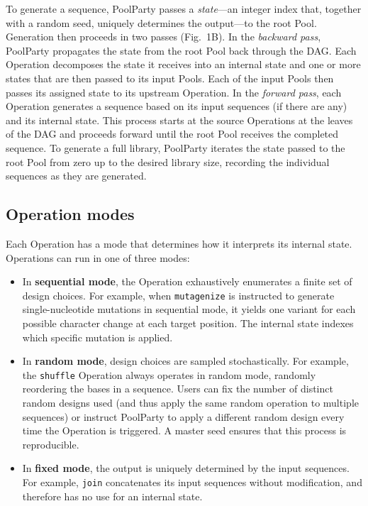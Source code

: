 \documentclass[unnumsec,webpdf,modern,large]{mam-authoring-template}%
\theoremstyle{thmstyleone}%
\theoremstyle{thmstyletwo}%
\theoremstyle{thmstylethree}%
\begin{document}
To generate a sequence, PoolParty passes a \emph{state}---an integer index that, together with a random seed, uniquely determines the output---to the root Pool. Generation then proceeds in two passes (Fig.~1B). In the \emph{backward pass}, PoolParty propagates the state from the root Pool back through the DAG. Each Operation decomposes the state it receives into an internal state and one or more states that are then passed to its input Pools. Each of the input Pools then passes its assigned state to its upstream Operation. In the \emph{forward pass}, each Operation generates a sequence based on its input sequences (if there are any) and its internal state. This process starts at the source Operations at the leaves of the DAG and proceeds forward until the root Pool receives the completed sequence. To generate a full library, PoolParty iterates the state passed to the root Pool from zero up to the desired library size, recording the individual sequences as they are generated.

\subsection{Operation modes}

Each Operation has a mode that determines how it interprets its internal state. Operations can run in one of three modes:

\begin{itemize}
\item In \textbf{sequential mode}, the Operation exhaustively enumerates a finite set of design choices. For example, when \texttt{mutagenize} is instructed to generate single-nucleotide mutations in sequential mode, it yields one variant for each possible character change at each target position. The internal state indexes which specific mutation is applied.

\item In \textbf{random mode}, design choices are sampled stochastically. For example, the \texttt{shuffle} Operation always operates in random mode, randomly reordering the bases in a sequence. Users can fix the number of distinct random designs used (and thus apply the same random operation to multiple sequences) or instruct PoolParty to apply a different random design every time the Operation is triggered. A master seed ensures that this process is reproducible. 

\item In \textbf{fixed mode}, the output is uniquely determined by the input sequences. For example, \texttt{join} concatenates its input sequences without modification, and therefore has no use for an internal state. 
\end{itemize}
\end{document}
